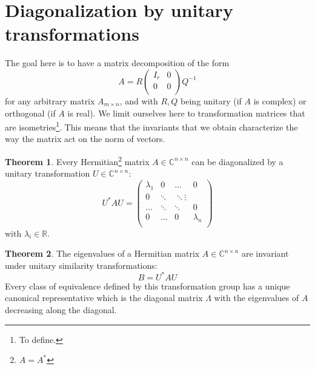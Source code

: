 \documentclass[12pt, openany]{report}
\theoremstyle{definition}
\newtheorem{thm}{Theorem}[chapter]
\newcommand{\R}{\mathbb{R}}
\newcommand{\C}{\mathbb{C}}
\begin{document}
\section{Diagonalization by unitary transformations}
The goal here is to have a matrix decomposition of the form 
\begin{equation}
    A = R\begin{pmatrix}
        I_r & 0\\ 0& 0 \\
    \end{pmatrix}Q^{-1}
\end{equation}
for any arbitrary matrix \(A_{m\times n}\), and with \(R,Q\) being unitary (if \(A\) is complex) or orthogonal (if \(A\) is real). We limit ourselves here to transformation matrices that are isometries\footnote{To define.}. This means that the invariants that we obtain characterize the way the matrix act on the norm of vectors. 
\begin{thm}
    Every Hermitian\footnote{\(A=A^*\)} matrix \(A\in \C^{n\times n}\) can be diagonalized by a unitary transformation \(U\in \C^{n\times n}\):
    \begin{equation}
        U^*AU = \begin{pmatrix}
            \lambda_1 & 0 & \dots & 0\\
            0&\ddots &\ddots \vdots \\
            \dots & \ddots & \ddots & 0\\
            0 & \dots & 0 & \lambda_n\\
        \end{pmatrix}
    \end{equation}
    with \(\lambda_i\in \R\).
\end{thm}
\begin{thm} 
    The eigenvalues of a Hermitian matrix \(A\in \C^{n\times n}\) are invariant under unitary similarity transformations:
    \begin{equation}
        B=U^*AU
    \end{equation}
    Every class of equivalence defined by this transformation group has a unique canonical representative which is the diagonal matrix \(\Lambda\) with the eigenvalues of \(A\) decreasing along the diagonal.
\end{thm}
\end{document}
